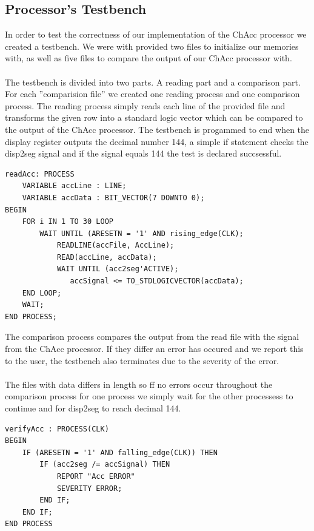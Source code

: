 \documentclass[a4paper,11pt]{article}
\begin{document}
\subsection{Processor's Testbench}
In order to test the correctness of our implementation of the ChAcc processor 
we created a testbench. We were with provided two files to initialize our 
memories with, as well as five files to compare the output of our ChAcc 
processor with.\\\\
\noindent
The testbench is divided into two parts. A reading part and a comparison part. 
For each ''comparision file'' we created one reading 
process and one comparison process. The reading process simply reads each 
line of the provided file and transforms the given row into a standard 
logic vector which can be compared to the output of the ChAcc processor. 
The testbench is progammed to end when the display register outputs the 
decimal number 144, a simple if statement checks the disp2seg signal and if 
the signal equals 144 the test is declared succsessful.  

\begin{lstlisting}[frame=single]
readAcc: PROCESS
    VARIABLE accLine : LINE;
    VARIABLE accData : BIT_VECTOR(7 DOWNTO 0);
BEGIN
    FOR i IN 1 TO 30 LOOP
        WAIT UNTIL (ARESETN = '1' AND rising_edge(CLK);
            READLINE(accFile, AccLine);
            READ(accLine, accData);
            WAIT UNTIL (acc2seg'ACTIVE);
               accSignal <= TO_STDLOGICVECTOR(accData);
    END LOOP;
    WAIT;
END PROCESS;
\end{lstlisting}

\noindent
The comparison process compares the 
output from the read file with the signal from the ChAcc processor. 
If they differ an error has occured and we report this to the user, 
the testbench also terminates due to the severity of the error.\\\\
The files with data differs in length so ff no errors occur throughout 
the comparison process for one process we simply wait for the other processess 
to continue and for disp2seg to reach decimal 144.

\begin{lstlisting}[frame=single]
verifyAcc : PROCESS(CLK)
BEGIN
    IF (ARESETN = '1' AND falling_edge(CLK)) THEN
        IF (acc2seg /= accSignal) THEN
            REPORT "Acc ERROR"
            SEVERITY ERROR;
        END IF;
    END IF;
END PROCESS
\end{lstlisting}
\end{document}
